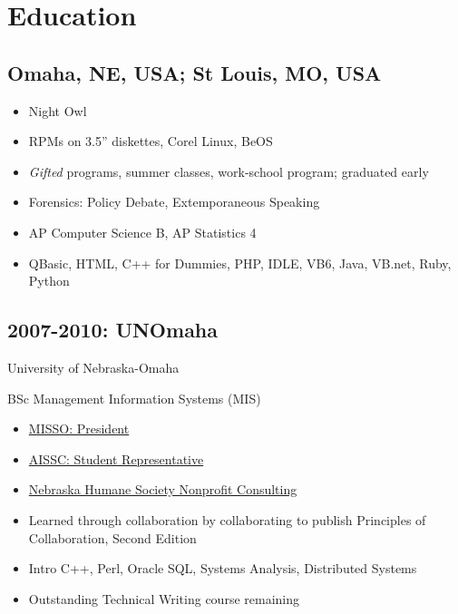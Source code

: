 \documentclass[letter,,openany,oneside]{sphinxhowto}
\begin{document}
\section{Education}
\label{resume:education}

\subsection{Omaha, NE, USA; St Louis, MO, USA}
\label{resume:omaha-ne-usa-st-louis-mo-usa}\begin{itemize}
\item {} 
Night Owl

\item {} 
RPMs on 3.5'' diskettes, Corel Linux, BeOS

\item {} 
\emph{Gifted} programs, summer classes, work-school program; graduated early

\item {} 
Forensics: Policy Debate, Extemporaneous Speaking

\item {} 
AP Computer Science B, AP Statistics 4

\item {} 
QBasic, HTML, C++ for Dummies, PHP, IDLE, VB6, Java, VB.net, Ruby, Python

\end{itemize}


\subsection{2007-2010: UNOmaha}
\label{resume:unomaha}
\begin{DUlineblock}{0em}
\item[] University of Nebraska-Omaha
\item[] BSc Management Information Systems (MIS)
\end{DUlineblock}
\begin{itemize}
\item {} 
{\hyperref[resume:uno-misso-president]{MISSO: President}}

\item {} 
{\hyperref[resume:ais-student-chapters-representative]{AISSC: Student Representative}}

\item {} 
{\hyperref[resume:id2]{Nebraska Humane Society Nonprofit Consulting}}

\item {} 
Learned through collaboration by collaborating to publish
Principles of Collaboration, Second Edition

\item {} 
Intro C++, Perl, Oracle SQL, Systems Analysis, Distributed Systems

\item {} 
Outstanding Technical Writing course remaining

\end{itemize}
\label{resume:uno-misso-president}\label{resume:misso-president}\label{resume:ais-student-chapters-representative}\label{resume:aissc-student-representative}
\end{document}
